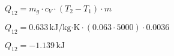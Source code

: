 \( Q_{12} = m_g \cdot c_V \cdot (T_2 - T_1) \cdot m \)  

\( Q_{12} = 0.633 \, \text{kJ/kg·K} \cdot (0.063 \cdot 5000) \cdot 0.0036 \)  

\( Q_{12} = -1.139 \, \text{kJ} \)
